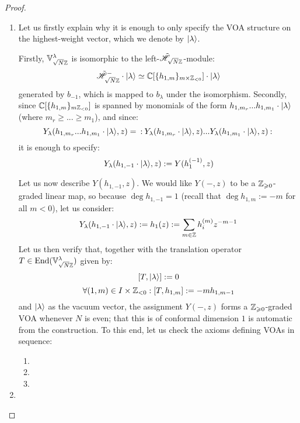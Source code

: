                 \begin{proof}
                    \begin{enumerate}
                        \item Let us firstly explain why it is enough to only specify the VOA structure on the highest-weight vector, which we denote by $\lvert {\lambda} \rangle$.
                        
                        Firstly, $\mathbb{V}_{\sqrt{N} \mathbb{Z}}^{\lambda}$ is isomorphic to the left-$\tilde{\mathscr{H}}_{\sqrt{N} \mathbb{Z}}$-module:
                            $$\tilde{\scrH}_{\sqrt{N} \Z}^- \cdot \ket{\lambda} \cong \bbC[ \{h_{1, m}\}_{m \x \Z_{< 0}} ] \cdot \ket{\lambda}$$
                        generated by $b_{-1}$, which is mapped to $b_{\lambda}$ under the isomorphism. Secondly, since $\mathbb{C}[ \{h_{1, m}\}_{m \mathbb{Z}_{< 0}} ]$ is spanned by monomials of the form $h_{1, m_r} ... h_{1, m_1} \cdot \lvert {\lambda} \rangle$ (where $m_r \geq ... \geq m_1$), and since:
                            $$Y_{\lambda}(h_{1, m_r} ... h_{1, m_1} \cdot \lvert {\lambda} \rangle, z) = \: \mathbf{:} \: { Y_{\lambda}(h_{1, m_r} \cdot \lvert {\lambda} \rangle, z) ... Y_{\lambda}(h_{1, m_1} \cdot \lvert {\lambda} \rangle, z) }  \: \mathbf{:} \:$$
                        it is enough to specify:
                            $$Y_{\lambda}(h_{1, -1} \cdot \lvert {\lambda} \rangle, z) := Y(h_1^{(-1)}, z)$$

                        Let us now describe $Y(h_{1, -1}, z)$. We would like $Y(-, z)$ to be a $\mathbb{Z}_{\geqslant 0}$-graded linear map, so because $\deg h_{1, -1} = 1$ (recall that $\deg h_{1, m} := -m$ for all $m < 0$), let us consider:
                            $$Y_{\lambda}(h_{1, -1} \cdot \lvert {\lambda} \rangle, z) := h_1(z) := \sum_{m \in \mathbb{Z}} h_i^{(m)} z^{-m - 1}$$
                        Let us then verify that, together with the translation operator $T \in \mathrm{End}(\mathbb{V}_{\sqrt{N}\mathbb{Z}}^{\lambda})$ given by:
                            $$[T, \lvert {\lambda} \rangle] := 0$$
                            $$\forall (1, m) \in I \x \Z_{< 0}: [T, h_{1, m}] := -m h_{1, m - 1}$$
                        and $\lvert {\lambda} \rangle$ as the vacuum vector, the assignment $Y(-, z)$ forms a $\mathbb{Z}_{\geqslant 0}$-graded VOA whenever $N$ is even; that this is of conformal dimension $1$ is automatic from the construction. To this end, let us check the axioms defining VOAs in sequence:
                        \begin{enumerate}
                            \item 
                            \item 
                            \item 
                        \end{enumerate}
                        \item 
                    \end{enumerate}
                \end{proof}

